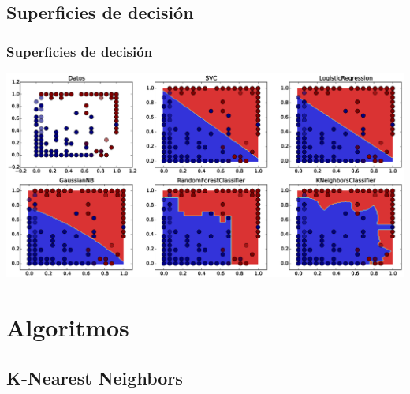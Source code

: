 \documentclass[10pt]{beamer}
\begin{document}
\subsection{Superficies de decisi\'on}

\begin{frame}
	\frametitle{Superficies de decisi\'on}
	\centering\includegraphics[width = 1.0\textwidth]{digitos,_curvas_de_decision21-28}
\end{frame}

\section{Algoritmos}

\subsection{K-Nearest Neighbors}
\end{document}
